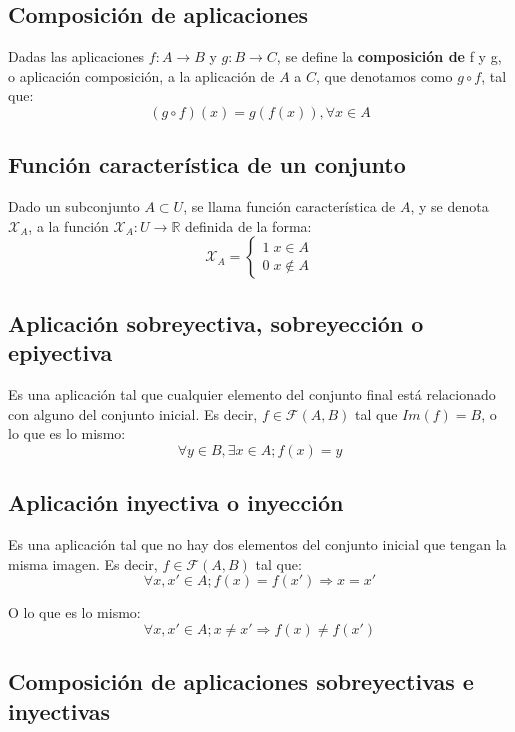 \subsection{Composición de aplicaciones}

Dadas las aplicaciones $f: A \longrightarrow B$ y $g: B \longrightarrow C$, se define la \textbf{composición de} f y g, o aplicación composición, a la aplicación de $A$ a $C$, que denotamos como $g \circ f$, tal que:
\[
(g \circ f)(x) = g(f(x)), \forall x \in A
\]

\subsection{Función característica de un conjunto}

Dado un subconjunto $A \subset U$, se llama función característica de $A$, y se denota $\mathcal{X}_A$, a la función $\mathcal{X}_A: U \longrightarrow \mathbb{R}$ definida de la forma:
\[
\mathcal{X}_A = \begin{cases}
1 \; x \in A \\
0 \; x \not \in A
\end{cases}
\]

\subsection{Aplicación sobreyectiva, sobreyección o epiyectiva}

Es una aplicación tal que cualquier elemento del conjunto final está relacionado con alguno del conjunto inicial. Es decir, $f \in \mathcal{F}(A,B)$ tal que $Im(f)=B$, o lo que es lo mismo:
\[
\forall y \in B, \exists x \in A; f(x) = y
\]

\subsection{Aplicación inyectiva o inyección}

Es una aplicación tal que no hay dos elementos del conjunto inicial que tengan la misma imagen. Es decir, $f \in \mathcal{F}(A,B)$ tal que:
\[
\forall x, x' \in A; f(x)=f(x') \Rightarrow x=x'
\]

O lo que es lo mismo:
\[
\forall x, x' \in A; x \neq x' \Rightarrow f(x) \neq f(x')
\]

\subsection{Composición de aplicaciones sobreyectivas e inyectivas}

